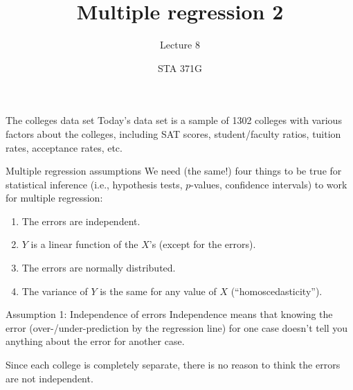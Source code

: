 \documentclass{beamer}\usepackage[]{graphicx}\usepackage[]{color}
\title{Multiple regression 2}
\subtitle{Lecture 8}
\author{STA 371G}
\begin{document}
  
  

  \frame{\maketitle}



  \begin{darkframes}
    \begin{frame}
    \end{frame}

    \begin{frame}{The colleges data set}
      Today's data set is a sample of 1302 colleges with various factors about the colleges, including SAT scores, student/faculty ratios, tuition rates, acceptance rates, etc.
    \end{frame}

    \begin{frame}{Multiple regression assumptions}
      We need (the same!) four things to be true for statistical inference (i.e., hypothesis tests, $p$-values, confidence intervals) to work for multiple regression:
      \pause
      \begin{enumerate}
        \item The errors are independent.
        \item $Y$ is a linear function of the $X$'s (except for the errors).
        \item The errors are normally distributed.
        \item The variance of $Y$ is the same for any value of $X$ (``homoscedasticity'').
      \end{enumerate}
    \end{frame}

    \begin{frame}{Assumption 1: Independence of errors}
      Independence means that knowing the error (over-/under-prediction by the regression line) for one case doesn't tell you anything about the error for another case.

      \bigskip\pause

      Since each college is completely separate, there is no reason to think the errors are not independent.
    \end{frame}


\end{darkframes}
\end{document}
